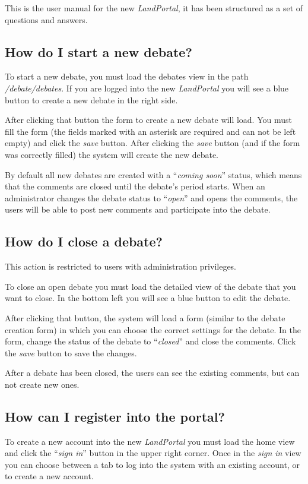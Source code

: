 This is the user manual for the new \textit{LandPortal}, it has been structured as a set of questions and answers.

\subsection{How do I start a new debate?}
To start a new debate, you must load the debates view in the path \textit{/debate/debates}.  If you are logged into the new \textit{LandPortal} you will see a blue button to create a new debate in the right side.

After clicking that button the form to create a new debate will load.  You must fill the form (the fields marked with an asterisk are required and can not be left empty) and click the \textit{save} button.  After clicking the \textit{save} button (and if the form was correctly filled) the system will create the new debate.

By default all new debates are created with a ``\textit{coming soon}'' status, which means that the comments are closed until the debate's period starts.  When an administrator changes the debate status to ``\textit{open}'' and opens the comments, the users will be able to post new comments and participate into the debate.

\subsection{How do I close a debate?}
This action is restricted to users with administration privileges.

To close an open debate you must load the detailed view of the debate that you want to close.  In the bottom left you will see a blue button to edit the debate.

After clicking that button, the system will load a form (similar to the debate creation form) in which you can choose the correct settings for the debate. In the form, change the status of the debate to ``\textit{closed}'' and close the comments.  Click the \textit{save} button to save the changes.

After a debate has been closed, the users can see the existing comments, but can not create new ones.

\subsection{How can I register into the portal?}
To create a new account into the new \textit{LandPortal} you must load the home view and click the ``\textit{sign in}'' button in the upper right corner.  Once in the \textit{sign in} view you can choose between a tab to log into the system with an existing account, or to create a new account.


